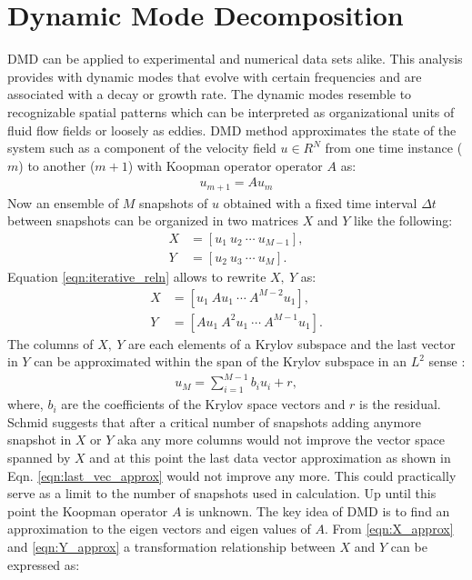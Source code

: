 \documentclass{article}
\begin{document}
\section{Dynamic Mode Decomposition} DMD can be applied to experimental and numerical data sets alike. This analysis provides with dynamic modes that evolve with certain frequencies and are associated with a decay or growth rate. The dynamic modes resemble to recognizable spatial patterns which can be interpreted as organizational units of fluid flow fields or loosely as eddies. DMD method approximates the state of the system such as a component of the velocity field $u \in R^{N}$ from one time instance ($m$) to another ($m+1$) with Koopman operator operator $A$ as:
\begin{align}
u_{m+1}= A u_{m}
\label{eqn:iterative_reln}
\end{align}
Now an ensemble of $M$ snapshots of $u$ obtained with a fixed time interval $\Delta t$ between snapshots can be organized in two matrices $X$ and $Y$ like the following:
\begin{align}
X & = [u_{1}\ u_{2} \ \cdots \ u_{M-1}], \\
Y & = [u_{2}\ u_{3} \ \cdots \ u_{M}].
\end{align}
Equation \ref{eqn:iterative_reln} allows to rewrite $X,\ Y$ as:
\begin{align}
X & = [u_{1}\ Au_{1} \ \cdots \ A^{M-2}u_{1}] \label{eqn:X_approx}, \\
Y & = [Au_{1}\ A^{2}u_{1} \ \cdots \ A^{M-1}u_{1}] \label{eqn:Y_approx}. 
\end{align}
The columns of $X,\ Y$ are each elements of a Krylov subspace and the last vector in $Y$ can be approximated within the span of the Krylov subspace in an $L^{2}$ sense \citep{kutz_book2013}:
\begin{align}
u_{M} = \sum_{i=1}^{M-1}b_{i} u_{i}+ r,
\label{eqn:last_vec_approx}
\end{align}
where, $b_i$ are the coefficients of the Krylov space vectors and $r$ is the residual. Schmid \citep{schmid_jfm2010} suggests that after a critical number of snapshots adding anymore snapshot in $X$ or $Y$ aka any more columns would not improve the vector space spanned by $X$ and at this point the last data vector approximation as shown in Eqn. \ref{eqn:last_vec_approx} would not improve any more. This could practically serve as a limit to the number of snapshots used in calculation. Up until this point the Koopman operator $A$ is unknown. The key idea of DMD is to find an approximation to the eigen vectors and eigen values of $A$. From \ref{eqn:X_approx} and \ref{eqn:Y_approx} a transformation relationship between $X$ and $Y$ can be expressed as:
\end{document}
